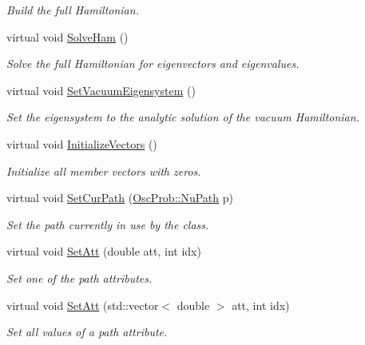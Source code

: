 \begin{DoxyCompactItemize}
\begin{DoxyCompactList}\small\item\em Build the full Hamiltonian. \end{DoxyCompactList}\item 
virtual void \hyperlink{classOscProb_1_1PMNS__Fast_a8a0828401591e88c60e0051fbfe02d5e}{Solve\+Ham} ()
\begin{DoxyCompactList}\small\item\em Solve the full Hamiltonian for eigenvectors and eigenvalues. \end{DoxyCompactList}\item 
virtual void \hyperlink{classOscProb_1_1PMNS__Fast_a76dd5a761df8689c502b28ad0391f9e2}{Set\+Vacuum\+Eigensystem} ()
\begin{DoxyCompactList}\small\item\em Set the eigensystem to the analytic solution of the vacuum Hamiltonian. \end{DoxyCompactList}\item 
virtual void \hyperlink{classOscProb_1_1PMNS__Base_adf23b569112f9f9e0e592f01d79a5f3d}{Initialize\+Vectors} ()
\begin{DoxyCompactList}\small\item\em Initialize all member vectors with zeros. \end{DoxyCompactList}\item 
virtual void \hyperlink{classOscProb_1_1PMNS__Base_a986e6ebef09a7e2eb7fee16a4c2c834d}{Set\+Cur\+Path} (\hyperlink{structOscProb_1_1NuPath}{Osc\+Prob\+::\+Nu\+Path} p)
\begin{DoxyCompactList}\small\item\em Set the path currently in use by the class. \end{DoxyCompactList}\item 
virtual void \hyperlink{classOscProb_1_1PMNS__Base_aba565962a440d14bee7a2a96d2eca2c5}{Set\+Att} (double att, int idx)
\begin{DoxyCompactList}\small\item\em Set one of the path attributes. \end{DoxyCompactList}\item 
virtual void \hyperlink{classOscProb_1_1PMNS__Base_aa001479b5f5828c3d16ed087f96ecbcc}{Set\+Att} (std\+::vector$<$ double $>$ att, int idx)
\begin{DoxyCompactList}\small\item\em Set all values of a path attribute. \end{DoxyCompactList}\item 

\end{DoxyCompactItemize}
